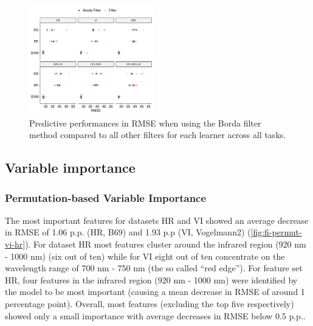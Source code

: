 \documentclass[journal]{IEEEtran}
\begin{document}
\begin{figure} [t!]
	\centering
	\begin{center}
		\includegraphics[width=0.48\textwidth] {filter-effect-all-vs-borda-filter-1.pdf}
		\caption{Predictive performances in RMSE when using the Borda filter method compared to all other filters for each learner across all tasks.}\label{fig:filter-effects-borda}
	\end{center}
\end{figure}

\subsection{Variable importance}

\subsubsection{Permutation-based Variable Importance}


The most important features for datasets HR and VI showed an average decrease in RMSE of 1.06 p.p. (HR, B69) and 1.93 p.p (VI, Vogelmann2) (\autoref{fig:fi-permut-vi-hr}).
For dataset HR most features cluster around the infrared region (920 nm - 1000 nm) (six out of ten) while for VI eight out of ten concentrate on the wavelength range of 700 nm - 750 nm (the so called \enquote{red edge}).
For feature set HR, four features in the infrared region (920 nm - 1000 nm) were identified by the model to be most important (causing a mean decrease in RMSE of around 1 percentage point).
Overall, most features (excluding the top five respectively) showed only a small importance with average decreases in RMSE below 0.5 p.p..
\end{document}

